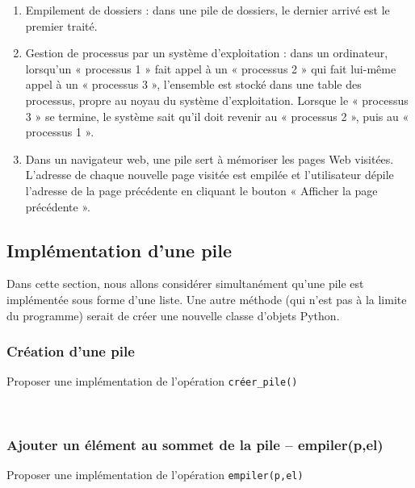 \documentclass[10pt,fleqn]{article} %
\begin{document}
\begin{enumerate}
\item Empilement de dossiers : dans une pile de dossiers, le dernier arrivé est le premier traité.

\item Gestion de processus par un système d’exploitation : dans un ordinateur, lorsqu’un « processus 1 » fait appel à un « processus 2 » qui fait lui-même appel à un « processus 3 », l’ensemble est stocké dans une table des processus, propre au noyau du système d’exploitation. Lorsque le « processus 3 » se termine, le système sait qu’il doit revenir au « processus 2 », puis au « processus 1 ». 
\item Dans un navigateur web, une pile sert à mémoriser les pages Web visitées. L'adresse de chaque nouvelle page visitée est empilée et l'utilisateur dépile l'adresse de la page précédente en cliquant le bouton « Afficher la page précédente ».
\end{enumerate}

\subsection{Implémentation d'une pile}
Dans cette section, nous allons considérer simultanément qu'une pile est implémentée sous forme d'une liste. Une autre méthode (qui n'est pas à la limite du programme) serait de créer une nouvelle classe d'objets Python.

\subsubsection*{Création d'une pile}
Proposer une implémentation de l'opération \texttt{créer\_pile()}

\begin{py}~\\
\vspace{2cm}
\end{py}

\subsubsection*{Ajouter un élément au sommet de la pile -- \textbf{empiler(p,el)}}
Proposer une implémentation de l'opération \texttt{empiler(p,el)}

\begin{py}~\\
\vspace{3cm}
\end{py}
\end{document}

